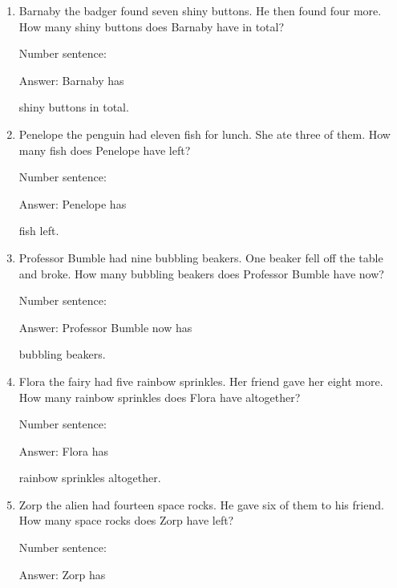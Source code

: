 \documentclass{tufte-book}
\begin{document}
\begin{enumerate}

\item
  Barnaby the badger found seven shiny buttons. He then found four more.
  How many shiny buttons does Barnaby have in total?\medskip\par
  Number sentence:
  \dotfill\medskip\par
  Answer: Barnaby has
  \dotfill\medskip\par\mbox{}\dotfill\medskip\par\mbox{}\dotfill\bigskip
  shiny buttons in total.
\item
  Penelope the penguin had eleven fish for lunch. She ate three of them.
  How many fish does Penelope have left?\medskip\par
  Number sentence:
  \dotfill\medskip\par
  Answer: Penelope has
  \dotfill\medskip\par\mbox{}\dotfill\medskip\par\mbox{}\dotfill\bigskip
  fish left.
\item
  Professor Bumble had nine bubbling beakers. One beaker fell off the
  table and broke. How many bubbling beakers does Professor Bumble have
  now?\medskip\par
  Number sentence:
  \dotfill\medskip\par
  Answer: Professor Bumble now has
  \dotfill\medskip\par\mbox{}\dotfill\medskip\par\mbox{}\dotfill\bigskip
  bubbling beakers.
\item
  Flora the fairy had five rainbow sprinkles. Her friend gave her eight
  more. How many rainbow sprinkles does Flora have altogether?\medskip\par
  Number sentence:
  \dotfill\medskip\par
  Answer: Flora has
  \dotfill\medskip\par\mbox{}\dotfill\medskip\par\mbox{}\dotfill\bigskip
  rainbow sprinkles altogether.
\item
  Zorp the alien had fourteen space rocks. He gave six of them to his
  friend. How many space rocks does Zorp have left?\medskip\par
  Number sentence:
  \dotfill\medskip\par
  Answer: Zorp has
  \dotfill\medskip\par\mbox{}\dotfill\medskip\par\mbox{}\dotfill\bigskip

\end{enumerate}
\end{document}
